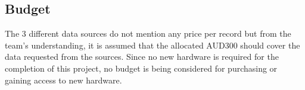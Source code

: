 \subsection{Budget}
The 3 different data sources do not mention any price per record but from the team’s understanding, it is assumed that the allocated AUD300 should cover the data requested from the sources. Since no new hardware is required for the completion of this project, no budget is being considered for purchasing or gaining access to new hardware.
